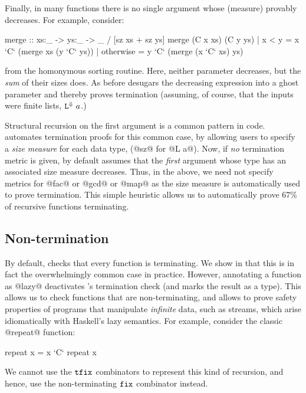 Finally, in many functions there is no single argument 
whose (measure) provably decreases. For example, consider:
%
\begin{code}
  merge :: xs:_ -> ys:_ -> _ / [sz xs + sz ys]
  merge (C x xs) (C y ys)
    | x < y     = x `C` (merge xs  (y `C` ys))
    | otherwise = y `C` (merge (x `C` xs)  ys)
\end{code}
%
from the homonymous sorting routine. Here, neither parameter
decreases, but the \emph{sum} of their sizes does. 
%
As before \toolname desugars the decreasing expression into 
a ghost parameter and thereby proves termination (assuming, 
of course, that the inputs were finite lists, \ie 
${\mathtt{L}}^{\Downarrow}\ a$.)

Structural recursion on the first argument is a common pattern 
in \lhaskell code.
%
\toolname automates termination proofs for this common case,
by allowing users to specify a \emph{size measure} 
for each data type, (\eg @sz@ for @L a@).
%
Now, if \emph{no} termination metric is given, by default 
\toolname assumes that the \emph{first} argument whose type
has an associated size measure decreases.
%
Thus, in the above, we need not specify metrics for @fac@ 
or @gcd@ or @map@ as the size measure is automatically 
used to prove termination. 
%
This simple heuristic allows us to {automatically}
prove 67\% of recursive functions terminating.


\subsection{Non-termination}

By default, \toolname checks that every function is 
terminating. We show in  that 
this is in fact the overwhelmingly common case in practice.
%
However, annotating a function as @lazy@ deactivates 
\toolname's termination check (and marks the result as a 
\Div type).
%
This allows us to check functions that are 
non-terminating, and allows \toolname to prove safety 
properties of programs that manipulate \emph{infinite} 
data, such as streams, which arise idiomatically with 
Haskell's lazy semantics.
% 
For example, consider the classic @repeat@ function:
%
\begin{code}
  repeat x = x `C` repeat x
\end{code}
%
We cannot use the $\mathtt{tfix}_{}$ combinators to 
represent this kind of recursion, and hence, 
use the non-terminating $\mathtt{fix}_{}$ combinator 
instead. 

